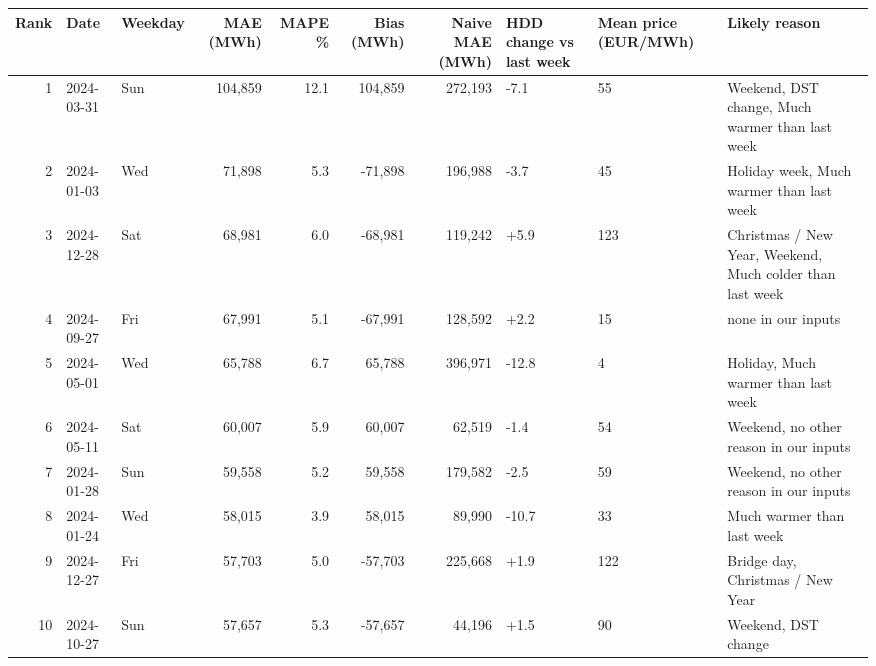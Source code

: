 \begin{tabular}{rllrrrrlll}
\toprule
Rank & Date & Weekday & MAE (MWh) & MAPE \% & Bias (MWh) & Naive MAE (MWh) & HDD change vs last week & Mean price (EUR/MWh) & Likely reason \\
\midrule
1 & 2024-03-31 & Sun & 104,859 & 12.1 & 104,859 & 272,193 & -7.1 & 55 & Weekend, DST change, Much warmer than last week \\
2 & 2024-01-03 & Wed & 71,898 & 5.3 & -71,898 & 196,988 & -3.7 & 45 & Holiday week, Much warmer than last week \\
3 & 2024-12-28 & Sat & 68,981 & 6.0 & -68,981 & 119,242 & +5.9 & 123 & Christmas / New Year, Weekend, Much colder than last week \\
4 & 2024-09-27 & Fri & 67,991 & 5.1 & -67,991 & 128,592 & +2.2 & 15 & none in our inputs \\
5 & 2024-05-01 & Wed & 65,788 & 6.7 & 65,788 & 396,971 & -12.8 & 4 & Holiday, Much warmer than last week \\
6 & 2024-05-11 & Sat & 60,007 & 5.9 & 60,007 & 62,519 & -1.4 & 54 & Weekend, no other reason in our inputs \\
7 & 2024-01-28 & Sun & 59,558 & 5.2 & 59,558 & 179,582 & -2.5 & 59 & Weekend, no other reason in our inputs \\
8 & 2024-01-24 & Wed & 58,015 & 3.9 & 58,015 & 89,990 & -10.7 & 33 & Much warmer than last week \\
9 & 2024-12-27 & Fri & 57,703 & 5.0 & -57,703 & 225,668 & +1.9 & 122 & Bridge day, Christmas / New Year \\
10 & 2024-10-27 & Sun & 57,657 & 5.3 & -57,657 & 44,196 & +1.5 & 90 & Weekend, DST change \\
\bottomrule
\end{tabular}
